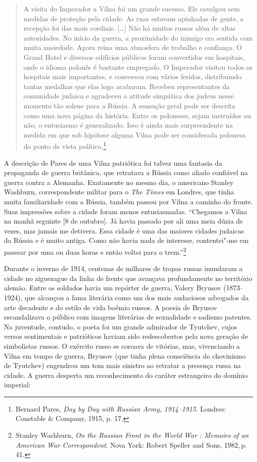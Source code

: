 \begin{quote}
A visita do Imperador a Vilna foi um grande sucesso. Ele cavalgou sem
medidas de proteção pela cidade. As ruas estavam apinhadas de gente, a
recepção foi das mais cordiais. [\ldots{}] Não há muitos russos além de
altas autoridades. No início da guerra, a proximidade do inimigo era
sentida com muita ansiedade. Agora reina uma atmosfera de trabalho e
confiança. O Grand Hotel e diversos edifícios públicos foram convertidos
em hospitais, onde o idioma polonês é bastante empregado. O Imperador
visitou todos os hospitais mais importantes, e conversou com vários
feridos, distribuindo tantas medalhas que elas logo acabaram. Recebeu
representantes da comunidade judaica e agradeceu a atitude simpática dos
judeus nesse momento tão solene para a Rússia. A sensação geral pode ser
descrita como uma nova página da história. Entre os poloneses, sejam
instruídos ou não, o entusiasmo é generalizado. Isso é ainda mais
surpreendente na medida em que sob hipótese alguma Vilna pode ser
considerada polonesa do ponto de vista político.\footnote{Bernard Pares, \textit{Day by Day with Russian Army, 1914--1915}. Londres: Constable \& Company, 1915, p. 17.} 
\end{quote}

A descrição de Pares de uma Vilna patriótica foi talvez uma fantasia da
propaganda de guerra britânica, que retratava a Rússia como aliado
confiável na guerra contra a Alemanha. Exatamente no mesmo dia, o
americano Stanley Washburn, correspondente militar para o \textit{The
Times} em Londres, que tinha muita familiaridade com a Rússia, também
passou por Vilna a caminho do fronte. Suas impressões sobre a cidade
foram menos entusiasmadas. ``Chegamos a Vilna na manhã seguinte {[}8 de
outubro{]}. Já havia passado por ali uma meia dúzia de vezes, mas jamais
me detivera. Essa cidade é uma das maiores cidades judaicas da Rússia e
é muito antiga. Como não havia nada de interesse, contentei"-me em
passear por uma ou duas horas e então voltei para o trem.''\footnote{Stanley Washburn, \textit{On the Russian Front in the World War : Memoirs of an American War Correspondent}. Nova York: Robert Speller and Sons, 1982,\,p.\,41.} %

Durante o inverno de 1914, centenas de milhares de tropas russas
inundaram a cidade no ziguezague da linha de frente que avançava
profundamente no território alemão. Entre os soldados havia um repórter
de guerra, Valery Bryusov (1873--1924), que alcançou a fama literária
como um dos mais audaciosos advogados da arte decadente e do estilo de
vida boêmio russos. A poesia de Bryusov escandalizava o público com
imagens literárias de sexualidade e sadismo patentes. Na juventude,
contudo, o poeta foi um grande admirador de Tyutchev, cujos versos
sentimentais e patrióticos haviam sido redescobertos pela nova geração
de simbolistas russos. O exército russo se coroava de vitórias, mas,
vivenciando a Vilna em tempo de guerra, Bryusov (que tinha plena
consciência do chovinismo de Tyutchev) engendrou um tom mais sinistro ao
retratar a presença russa na cidade. A guerra desperta um reconhecimento
do caráter estrangeiro do domínio imperial:

